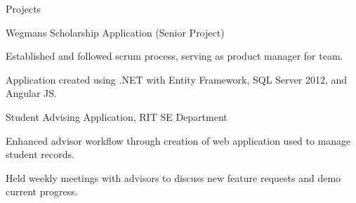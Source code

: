 \documentclass{resume} %
\begin{document}
\begin{rSection}{Projects}
\begin{rSubsection}{Wegmans Scholarship Application (Senior Project)}{}{}{}
\item Established and followed scrum process, serving as product manager for team.
\item Application created using .NET with Entity Framework, SQL Server 2012, and Angular JS.
\end{rSubsection}

\begin{rSubsection}{Student Advising Application, RIT SE Department}{}{}{}
\item Enhanced advisor workflow through creation of web application used to manage student records. 
\item Held weekly meetings with advisors to discuss new feature requests and demo current progress.
\end{rSubsection}
\end{rSection}




\end{document}
